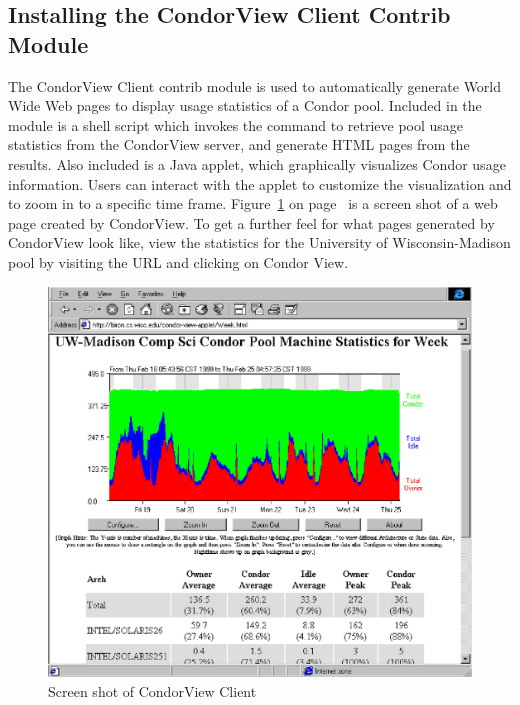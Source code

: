 \subsection{\label{sec:CondorView-Client-Install}
Installing the CondorView Client Contrib Module} 

The CondorView Client contrib module is used to automatically generate
World Wide Web pages to display usage statistics of a Condor
pool.
Included in the module is a shell script which invokes the 
command to retrieve pool usage statistics from the CondorView server, and
generate HTML pages from the results.  
Also included is a Java applet, which graphically visualizes Condor 
usage information.  
Users can interact with the applet to customize the visualization and to
zoom in to a specific time frame.
Figure~\ref{fig:view-screenshot} on page~\pageref{fig:view-screenshot}
is a screen shot of a web page created by CondorView.  
To get a further feel for what pages generated by CondorView look like,
view the statistics for the University of Wisconsin-Madison pool
by visiting the URL  and clicking on
Condor View.

\begin{figure}[hbt]
\centering
\includegraphics{admin-man/view-screenshot.ps}
\caption{\label{fig:view-screenshot}Screen shot of CondorView Client}
\end{figure}

